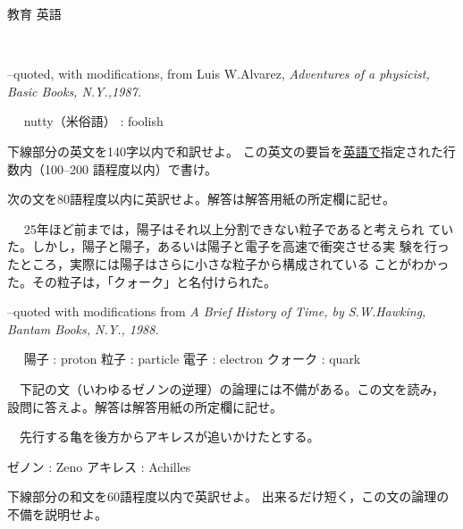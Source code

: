 \documentclass[fleqn]{jbook}
\begin{document}
\begin{question}{教育 英語}{}
\begin{subquestions}
%
 \begin{flushright}
   --quoted, with modifications, from Luis W.Alvarez, \em Adventures of a 
physicist, \em Basic Books, N.Y.,1987.
  \end{flushright}
　
  nutty（米俗語） : foolish 
\baselineskip=15pt

  \noindent{[設問]}
  \begin{subsubquestions}
  \SubSubQuestion
    下線部分の英文を140字以内で和訳せよ。
  \SubSubQuestion
     この英文の要旨を\underline{英語で}指定された行数内（100--200
語程度以内）で書け。
   \end{subsubquestions}






\SubQuestion
次の文を80語程度以内に英訳せよ。解答は解答用紙の所定欄に記せ。

  　 25年ほど前までは，陽子はそれ以上分割できない粒子であると考えられ
   ていた。しかし，陽子と陽子，あるいは陽子と電子を高速で衝突させる実
   験を行ったところ，実際には陽子はさらに小さな粒子から構成されている
   ことがわかった。その粒子は，「クォーク」と名付けられた。
%
 \begin{flushright}
    --quoted with modifications from \em A Brief History of Time, \em
by S.W.Hawking, Bantam Books, N.Y., 1988.
 \end{flushright}

 　 陽子 : proton \quad 
    粒子 : particle \quad 
    電子 : electron \quad 
    クォーク : quark 



\SubQuestion
 　下記の文（いわゆるゼノンの逆理）の論理には不備がある。この文を読み，
  設問に答えよ。解答は解答用紙の所定欄に記せ。

  　先行する亀を後方からアキレスが追いかけたとする。

ゼノン : Zeno \quad %
アキレス : Achilles

\begin{subsubquestions}
\SubSubQuestion
  下線部分の和文を60語程度以内で英訳せよ。
\SubSubQuestion
   出来るだけ短く，この文の論理の不備を説明せよ。
\end{subsubquestions}   

\end{subquestions}
\end{question}
\end{document}
